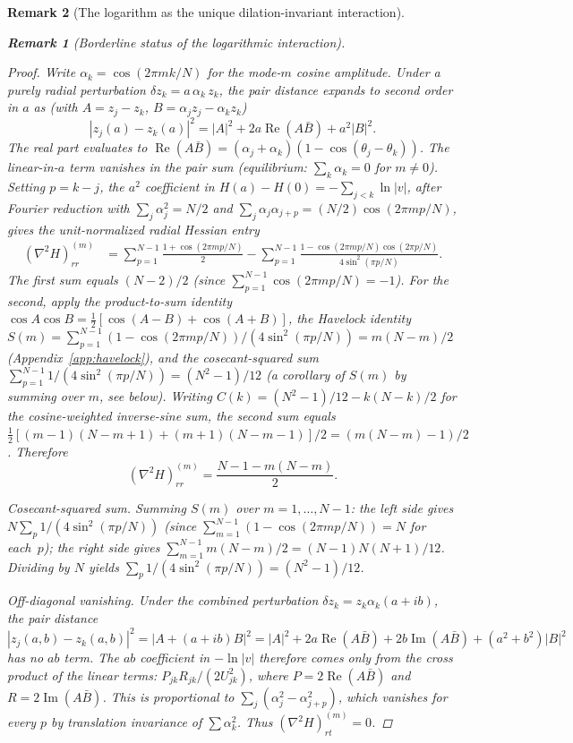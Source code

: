 \documentclass[12pt, a4paper]{article}
\newtheorem{remark}{Remark}[section]
\numberwithin{equation}{section}
\begin{document}
\begin{remark}[The logarithm as the unique dilation-invariant interaction]
\begin{remark}[Borderline status of the logarithmic interaction]
\begin{proof}
Write $\alpha_k = \cos(2\pi m k / N)$ for the mode-$m$ cosine
amplitude. Under a purely radial perturbation
$\delta z_k = a\,\alpha_k\,z_k$, the pair distance expands to
second order in $a$ as (with $A = z_j - z_k$,
$B = \alpha_j z_j - \alpha_k z_k$)
\[
  |z_j(a) - z_k(a)|^2
   = |A|^2 + 2a\operatorname{Re}(A\bar B) + a^2|B|^2.
\]
The real part evaluates to
$\operatorname{Re}(A\bar B) = (\alpha_j + \alpha_k)(1 - \cos(\theta_j - \theta_k))$.
The linear-in-$a$ term vanishes in the pair sum (equilibrium:
$\sum_k \alpha_k = 0$ for $m \ne 0$). Setting $p = k - j$, the
$a^2$ coefficient in $H(a) - H(0) = -\sum_{j<k}\ln|v|$, after
Fourier reduction with
$\sum_j \alpha_j^2 = N/2$ and
$\sum_j \alpha_j\alpha_{j+p} = (N/2)\cos(2\pi mp/N)$, gives the
unit-normalized radial Hessian entry
\begin{align*}
  (\nabla^2 H)_{rr}^{(m)}
   &= \sum_{p=1}^{N-1} \frac{1 + \cos(2\pi mp/N)}{2}
      - \sum_{p=1}^{N-1}
        \frac{1 - \cos(2\pi mp/N)\cos(2\pi p/N)}{4\sin^2(\pi p/N)}.
\end{align*}
The first sum equals $(N{-}2)/2$ (since
$\sum_{p=1}^{N-1}\cos(2\pi mp/N) = -1$). For the second, apply
the product-to-sum identity $\cos A\cos B = \tfrac12[\cos(A{-}B) +
\cos(A{+}B)]$, the Havelock identity
$S(m) = \sum_{p=1}^{N-1}(1 - \cos(2\pi mp/N))/(4\sin^2(\pi p/N))
= m(N{-}m)/2$ (Appendix~\ref{app:havelock}), and the
cosecant-squared sum
$\sum_{p=1}^{N-1}1/(4\sin^2(\pi p/N)) = (N^2 - 1)/12$
(a corollary of $S(m)$ by summing over $m$, see below).
Writing $C(k) = (N^2{-}1)/12 - k(N{-}k)/2$ for the cosine-weighted
inverse-sine sum, the second sum equals
$\tfrac12[(m{-}1)(N{-}m{+}1) + (m{+}1)(N{-}m{-}1)]/2
= (m(N{-}m) - 1)/2$.
Therefore
\begin{equation}\label{eq:rr-unshifted-paper}
  (\nabla^2 H)_{rr}^{(m)} = \frac{N - 1 - m(N{-}m)}{2}.
\end{equation}

\emph{Cosecant-squared sum.}
Summing $S(m)$ over $m = 1, \ldots, N{-}1$: the left side gives
$N \sum_{p} 1/(4\sin^2(\pi p/N))$ (since
$\sum_{m=1}^{N-1}(1 - \cos(2\pi mp/N)) = N$ for each~$p$);
the right side gives $\sum_{m=1}^{N-1}m(N{-}m)/2 = (N{-}1)N(N{+}1)/12$.
Dividing by $N$ yields $\sum_p 1/(4\sin^2(\pi p/N)) = (N^2 - 1)/12$.

\emph{Off-diagonal vanishing.}
Under the combined perturbation $\delta z_k = z_k\alpha_k(a + ib)$,
the pair distance $|z_j(a,b) - z_k(a,b)|^2 = |A + (a{+}ib)B|^2
= |A|^2 + 2a\operatorname{Re}(A\bar B) + 2b\operatorname{Im}(A\bar B) + (a^2 + b^2)|B|^2$
has no $ab$ term. The $ab$ coefficient in $-\ln|v|$ therefore comes
only from the cross product of the linear terms:
$P_{jk}R_{jk}/(2U_{jk}^2)$, where
$P = 2\operatorname{Re}(A\bar B)$ and
$R = 2\operatorname{Im}(A\bar B)$. This is proportional to
$\sum_j(\alpha_j^2 - \alpha_{j+p}^2)$, which vanishes for every $p$
by translation invariance of $\sum\alpha_k^2$. Thus
$(\nabla^2 H)_{rt}^{(m)} = 0$.


\end{proof}
\end{remark}
\end{remark}
\end{document}

